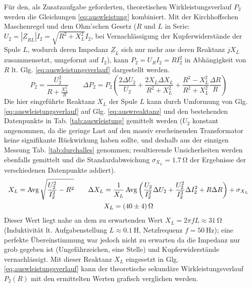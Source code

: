 \documentclass[12pt,a4paper,twoside]{article}
\DeclareMathOperator{\Avg}{Avg}                     %
\theoremstyle{definition}
\begin{document}
Für den, als Zusatzaufgabe geforderten, theoretischen Wirkleistungsverlauf $P_2$ werden die Gleichungen \ref{eq:auswleistung} kombiniert. Mit der Kirchhoffschen Maschenregel und dem Ohm'schen Gesetz ($R$ und $L$ in Serie: $U_2 = |\underbar{Z}_{RL}| I_2 = \sqrt{R^2 + X_L^2} I_2$, bei Vernachlässigung der Kupferwiderstände der Spule $L$, wodurch deren Impedanz $\underbar{Z}_L$ sich nur mehr aus deren Reaktanz $j X_L$ zusammensetzt, umgeformt auf $I_2$), kann $P_2=U_R I_2 = R I_2^2$ in Abhängigkeit von $R$ lt. Glg. \ref{eq:auswleistungsverlauf} dargestellt werden.
\begin{equation}
    P_2 = \frac{U_2^2}{R + \frac{X_L^2}{R}} \qquad \Delta P_2 = P_2 \left( \frac{2 \Delta U_2}{U_2} + \frac{2 X_L \Delta X_L}{R^2 + X_L^2} + \frac{R^2 - X_L^2}{R^2 + X_L^2} \frac{\Delta R}{R} \right)
    \label{eq:auswleistungsverlauf}
\end{equation}
Die hier eingeführte Reaktanz $X_L$ der Spule $L$ kann durch Umformung von Glg. \ref{eq:auswleistungsverlauf} auf Glg. \ref{eq:auswreaktanz} und den bestehenden Datenpunkte in Tab. \ref{tab:auswleistung} gemittelt werden ($U_2$ konstant angenommen, da die geringe Last auf den massiv erscheinenden Transformator keine signifikante Rückwirkung haben sollte, und deshalb aus der einzigen Messung Tab. \ref{tab:durchalles} genommen; resultierende Unsicherheiten werden ebenfalls gemittelt und die Standardabweichung $\sigma_{X_L}=\SI{1,7}{\ohm}$ der Ergebnisse der verschiedenen Datenpunkte addiert).
\begin{equation}
\begin{gathered}
    X_L = \Avg \sqrt{\frac{U_2^2}{I_2^2} - R^2} \qquad \Delta X_L = \frac{1}{X_L} \Avg \left( \frac{U_2}{I_2^2} \Delta U_2 + \frac{U_2^2}{I_2^3} \Delta I_2^2 + R \Delta R \right) + \sigma_{X_L} \\
    X_L = \SI{40+-4}{\ohm}
    \label{eq:auswreaktanz}
\end{gathered}
\end{equation}
Dieser Wert liegt nahe an dem zu erwartenden Wert $X_L=2\pi fL \approx \SI{31}{\ohm}$ (Induktivität lt. Aufgabenstellung $L \approx \SI{0,1}{\henry}$, Netzfrequenz $f=\SI{50}{\Hz}$); eine perfekte Übereinstimmung war jedoch nicht zu erwarten da die Impedanz nur grob gegeben ist (Ungefährzeichen, eine Stelle) und Kupferwiderstände vernachlässigt.
Mit dieser Reaktanz $X_L$ eingesetzt in Glg. \ref{eq:auswleistungsverlauf} kann der theoretische sekundäre Wirkleistungsverlauf $P_2(R)$ mit den ermittelten Werten grafisch verglichen werden.
\end{document}

